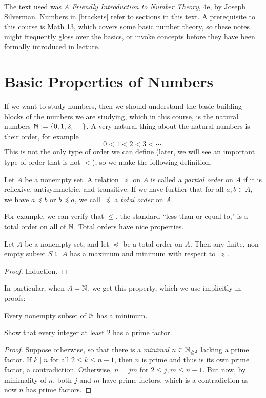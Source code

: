 \documentclass{article}
\begin{document}
The text used was \textit{A Friendly Introduction to Number Theory}, 4e, by Joseph Silverman. Numbers in [brackets] refer to sections in this text. A prerequisite to this course is Math 13, which covers some basic number theory, so these notes might frequently gloss over the basics, or invoke concepts before they have been formally introduced in lecture.

\setcounter{section}{12}
\section{Basic Properties of Numbers}
If we want to study numbers, then we should understand the basic building blocks of the numbers we are studying, which in this course, is the natural numbers $\mathbb N := \{0, 1, 2, \ldots\}$. A very natural thing about the natural numbers is their order, for example
$$0 < 1 < 2 < 3 < \cdots.$$
This is not the only type of order we can define (later, we will see an important type of order that is not $<$), so we make the following definition.
\begin{definition}
Let $A$ be a nonempty set. A relation $\preceq$ on $A$ is called a \textit{partial order} on $A$ if it is reflexive, antisymmetric, and transitive. If we have further that for all $a,b\in A$, we have $a\preceq b$ or $b \preceq a$, we call $\preceq$ a \textit{total order} on $A$.
\end{definition}

For example, we can verify that $\leq$, the standard ``less-than-or-equal-to," is a total order on all of $\mathbb N$. Total orders have nice properties.
\begin{proposition}
Let $A$ be a nonempty set, and let $\preceq$ be a total order on $A$. Then any finite, non-empty subset $S\subseteq A$ has a maximum and minimum with respect to $\preceq$.
\end{proposition}
\begin{proof}
Induction.
\end{proof}

In particular, when $A = \mathbb N$, we get this property, which we use implicitly in proofs:
\begin{theorem}
Every nonempty subset of $\mathbb N$ has a minimum.
\end{theorem}

\begin{example}
Show that every integer at least $2$ has a prime factor.
\end{example}
\begin{proof}
Suppose otherwise, so that there is a \textit{minimal} $n\in \mathbb N_{\geq 2}$ lacking a prime factor. If $k\mid n$ for all $2\leq k \leq n-1$, then $n$ is prime and thus is its own prime factor, a contradiction. Otherwise, $n = jm$ for $2 \leq j,m\leq n-1$. But now, by minimality of $n$, both $j$ and $m$ have prime factors, which is a contradiction as now $n$ has prime factors.
\end{proof}
\end{document}

